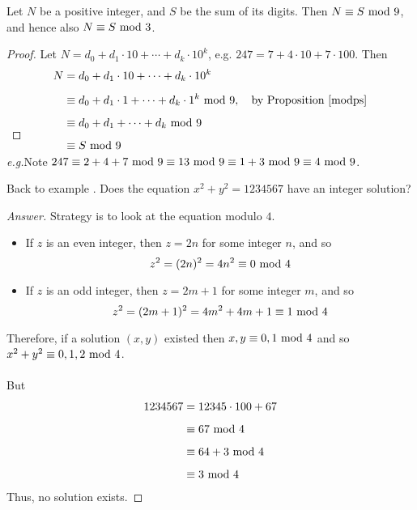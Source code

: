 
\begin{proposition}
Let $N$ be a positive integer, and $S$ be the sum of its digits. Then $N \equiv S\text{ mod }{9}$, and hence also $N \equiv S\text{ mod }{3}$.
\end{proposition}
\begin{proof}
Let $N = d_0 + d_1\cdot 10 + \cdots + d_k\cdot 10^k$, e.g. $247 = 7 + 4\cdot 10 + 7\cdot 100$. Then
\begin{align*}
N &= d_0 + d_1\cdot 10 + \cdots + d_k\cdot 10^k\\[0.5em]
&\equiv d_0 + d_1\cdot 1 + \cdots + d_k\cdot 1^k\text{ mod }{9},\quad\text{by Proposition \ref{modps}}\\[0.5em]
&\equiv d_0 + d_1 + \cdots + d_k\text{ mod }{9}\\[0.5em]
&\equiv S\text{ mod }{9}\\[-3em]
\end{align*}
\end{proof}
\emph{e.g.}\quad Note $247 \equiv 2 + 4 + 7 \text{ mod }{9} \equiv 13\text{ mod }{9} \equiv 1 + 3\text{ mod }{9} \equiv 4\text{ mod }{9}$.

\vspace*{3em}

Back to example . Does the equation $x^2 + y^2 = 1234567$ have an integer solution?
\begin{proof}[Answer]
Strategy is to look at the equation modulo $4$.
\begin{itemize}[leftmargin=*]
\item[] If $z$ is an even integer, then $z = 2n$ for some integer $n$, and so 
\[z^2 = (2n)^2 = 4n^2 \equiv 0\text{ mod }{4}\]
\item[] If $z$ is an odd integer, then $z = 2m+1$ for some integer $m$, and so 
\[z^2 = (2m+1)^2 = 4m^2 + 4m + 1 \equiv 1\text{ mod }{4}\]
\end{itemize}
Therefore, if a solution $(x,y)$ existed then $x,y \equiv 0,1\text{ mod }{4}$ and so $x^2 + y^2 \equiv 0,1,2\text{ mod }{4}$.\\
\\
But 
\begin{align*}
1234567 &= 12345\cdot 100 + 67\\[0.5em]
&\equiv 67\text{ mod }{4}\\[0.5em]
&\equiv 64 + 3\text{ mod }{4}\\[0.5em]
&\equiv 3\text{ mod }{4}
\end{align*}
Thus, no solution exists.
\end{proof}

